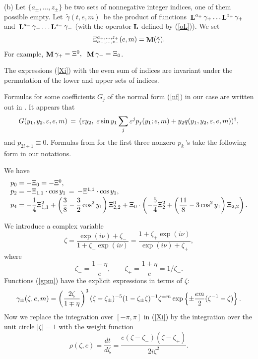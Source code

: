 \noindent
(b) Let $\{a_{\pm},\dots,z_{\pm}\}$ be
two sets of nonnegative integer indices,
one of them possible empty.
Let $\,\tilde{\gamma}(t,e,m)\,$ be the product
of functions
$\,\mathop{\bf L}\nolimits^{a_+}\gamma_+\dots\mathop{\bf L}\nolimits^{z_+}\gamma_+\,$ and
$\,\mathop{\bf L}\nolimits^{a_-}\gamma_-\dots\mathop{\bf L}\nolimits^{z_-}\gamma_-$
(with the operator $\mathop{\bf L}\nolimits$ defined by (\ref{oL})).
We set
\begin{equation}
\label{Xi}
\Xi^{a_+,\dots, z_+}_{a_-,\dots, z_-}(e,m) = \mathop{\bf M}\nolimits(\tilde{\gamma}).
\end{equation}
For example, $\mathop{\bf M}\nolimits\gamma_+=\Xi^0,\;\;\mathop{\bf M}\nolimits\gamma_-=\Xi_0$.
%
\begin{prp}
The expressions {\rm(\ref{Xi})} with the even sum
of indices
are invariant under the permutation of the lower and upper
sets of indices.
\end{prp}
%
Formulas for some coefficients $G_j$
of the normal form (\ref{nf}) in our case
are written out in \cite[Ch.~V]{Bru}.
It appears that
$$%
G(y_1,y_2,\eps,e,m)\,=\, (\eps y_2,\;\eps \sin y_1
\sum_j \eps^j p_j(y_1;e,m)+
y_2 q(y_1,y_2,\eps,e,m) )^{\dag},
$$%
and $p_{2l+1}\equiv0$.
Formulas from \cite{Bru} for the first
three nonzero $p_k\,$'s take
the following form in our notations.
\begin{tm} We have
$$%
\begin{array}{l}
p_0=-\Xi_0 =-\Xi^0,               \\
p_2=-\Xi_{1,1}\cdot\cos y_1 \,=\,-\Xi^{1,1}\cdot\cos y_1, \\[0.3ex]
\dst
p_4=-\frac14 \Xi_{1,1}^2+
     \left(\frac38-\frac32\cos^2 y_1\right)\Xi_{2,2}^0
     +\Xi_0\cdot\left(-\frac54 \Xi_2^2+
    \left(\frac{11}8-3\cos^2 y_1\right)\Xi_{2,2}\right).
\end{array}
$$%
\end{tm}
%
We introduce a complex variable
$$
\zeta=\frac{\exp(i\nu)+\zeta_-}{1+\zeta_-\exp(i\nu)}
     =\frac{1+\zeta_+\exp(i\nu)}{\exp(i\nu)+\zeta_+},
$$
where
$$
\zeta_-=\frac{1-\eta}{e},\qquad
\zeta_+=\frac{1+\eta}{e}=1/\zeta_-.
$$
%
Functions (\ref{gpm}) have the explicit expressions
in terms of $\zeta$:
$$
\gamma_{\pm}(\zeta,e,m)=\left(\frac{2\zeta}{1\mp\eta}\right)^{3}
     (\zeta-\zeta_{\pm})^{-5}(1-\zeta_{\pm}\zeta)^{-1}
     \zeta^{\pm m}\exp\left\{\pm\frac{em}{2}(\zeta^{-1}-
     \zeta)\right\}.
$$
Now we replace the integration over $[-\pi,\pi]$ in (\ref{Xi})
by the integration over the unit circle $|\zeta|=1$
with the weight function
$$\rho(\zeta,e)=\frac{dt}{d\zeta}=\frac{e(\zeta-
     \zeta_-)(\zeta-\zeta_+)}{2i\zeta^2}.
$$

